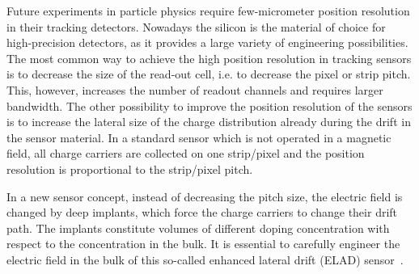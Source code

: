 
Future experiments in particle physics require few-micrometer position resolution in their tracking detectors. 
Nowadays the silicon is the material of choice for high-precision detectors, as it provides a large variety of engineering possibilities. 
The most common way to achieve the high position resolution in tracking sensors is to decrease the size of the read-out cell, i.e. to decrease the pixel or strip pitch. 
This, however, increases the number of readout channels and requires larger bandwidth. 
The other possibility to improve the position resolution of the sensors is to increase the lateral size of the charge distribution already during the drift in the sensor material. 
In a standard sensor which is not operated in a magnetic field, all charge carriers are collected on one strip/pixel and the position resolution is proportional to the strip/pixel pitch. 

In a new sensor concept, instead of decreasing the pitch size, the electric field is changed by deep implants, which force the charge carriers to change their drift path. 
The implants constitute volumes of different doping concentration with respect to the concentration in the bulk. 
It is essential to carefully engineer the electric field in the bulk of this so-called enhanced lateral drift (ELAD) sensor~\cite{JANSEN2016242}.
